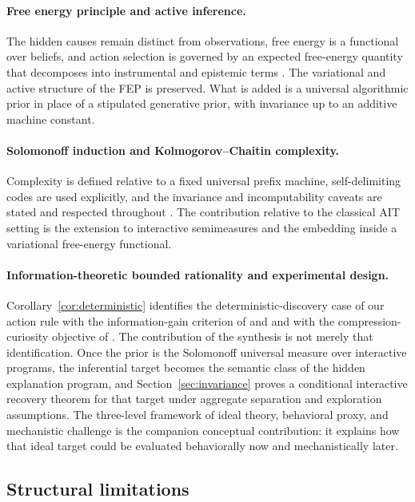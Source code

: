 \documentclass[11pt]{article}
\theoremstyle{remark}
\begin{document}
\paragraph{Free energy principle and active inference.}
The hidden causes remain distinct from observations, free energy is a functional over beliefs, and action selection is governed by an expected free-energy quantity that decomposes into instrumental and epistemic terms \citep{Friston2010,FristonEtAl2017Process,ParrFriston2019}. The variational and active structure of the FEP is preserved. What is added is a universal algorithmic prior in place of a stipulated generative prior, with invariance up to an additive machine constant.

\paragraph{Solomonoff induction and Kolmogorov--Chaitin complexity.}
Complexity is defined relative to a fixed universal prefix machine, self-delimiting codes are used explicitly, and the invariance and incomputability caveats are stated and respected throughout \citep{Solomonoff1964a,Solomonoff1964b,Kolmogorov1965,Chaitin1975}. The contribution relative to the classical AIT setting is the extension to interactive semimeasures and the embedding inside a variational free-energy functional.

\paragraph{Information-theoretic bounded rationality and experimental design.}
Corollary~\ref{cor:deterministic} identifies the deterministic-discovery case of our action rule with the information-gain criterion of \citet{Lindley1956} and \citet{ChalonerVerdinelli1995} and with the compression-curiosity objective of \citet{Schmidhuber2010}. The contribution of the synthesis is not merely that identification. Once the prior is the Solomonoff universal measure over interactive programs, the inferential target becomes the semantic class of the hidden explanation program, and Section~\ref{sec:invariance} proves a conditional interactive recovery theorem for that target under aggregate separation and exploration assumptions. The three-level framework of ideal theory, behavioral proxy, and mechanistic challenge is the companion conceptual contribution: it explains how that ideal target could be evaluated behaviorally now and mechanistically later.

\subsection{Structural limitations}
\end{document}
